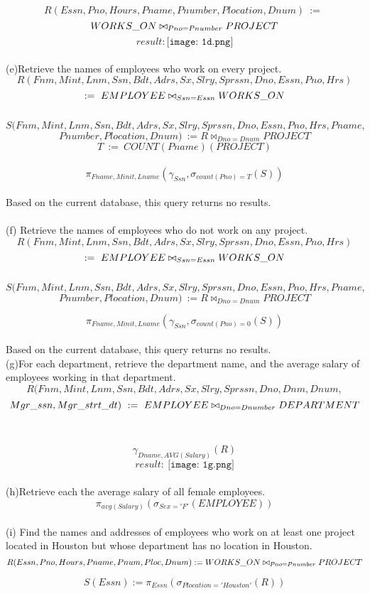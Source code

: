 \documentclass[paper=a4, fontsize=11pt]{scrartcl}
\begin{document}
$$R(Essn,Pno,Hours,Pname,Pnumber,Plocation,Dnum)\ :=\ $$
$$WORKS\char`_ON \bowtie _{Pno=Pnumber} PROJECT$$
$$result: \texttt{[image: 1d.png]}$$\\ 
(e)Retrieve the names of employees who work on every project.
$$R(Fnm, Mint, Lnm, Ssn, Bdt, Adrs, Sx, Slry, Sprssn, Dno,Essn,Pno,Hrs)$$ $$:=\ EMPLOYEE \bowtie_{Ssn=Essn} WORKS\char`_ON$$ \\ $$S(Fnm, Mint, Lnm, Ssn, Bdt, Adrs, Sx, Slry, Sprssn, Dno,Essn,Pno,Hrs,Pname,$$ $$Pnumber,Plocation,Dnum)\ := R \bowtie _{Dno=Dnum} PROJECT$$
$$T\ :=\ COUNT(Pname)(PROJECT)$$\\
$$\pi_{Fname,Minit,Lname}(\gamma_{Ssn}, \sigma_{count(Pno)=T}(S))$$\\
Based on the current database, this query returns no results.\\ \\
(f) Retrieve the names of employees who do not work on any project.
$$R(Fnm, Mint, Lnm, Ssn, Bdt, Adrs, Sx, Slry, Sprssn, Dno,Essn,Pno,Hrs)$$ $$:=\ EMPLOYEE \bowtie_{Ssn=Essn} WORKS\char`_ON$$ \\ $$S(Fnm, Mint, Lnm, Ssn, Bdt, Adrs, Sx, Slry, Sprssn, Dno,Essn,Pno,Hrs,Pname,$$ $$Pnumber,Plocation,Dnum)\ := R \bowtie _{Dno=Dnum} PROJECT$$

$$\pi_{Fname,Minit,Lname}(\gamma_{Ssn}, \sigma_{count(Pno)=0}(S))$$\\
Based on the current database, this query returns no results.\\ 
(g)For each department, retrieve the department name, and the average salary of employees working in that department.
$$R(Fnm, Mint, Lnm, Ssn, Bdt, Adrs, Sx, Slry, Sprssn, Dno,Dnm,Dnum,$$ $$Mgr\char`_ssn,Mgr\char`_strt\char`_dt)\ :=\ EMPLOYEE \bowtie_{Dno=Dnumber} DEPARTMENT$$\\ \\
$$\gamma_{Dname,AVG(Salary)}(R)$$
$$result:\ \texttt{[image: 1g.png]}$$ \\
(h)Retrieve each the average salary of all female employees.
$$\pi_{avg(Salary)}(\sigma_{Sex='F'}(EMPLOYEE))$$\\ 
(i) Find the names and addresses of employees who work on at least one project located in Houston but whose department has no location in Houston.
$$R(Essn,Pno,Hours,Pname,Pnum,Ploc,Dnum) := WORKS\char`_ON \bowtie_{Pno=Pnumber}PROJECT$$

$$S(Essn) := \pi_{Essn}(\sigma_{Plocation='Houston'}(R))$$
\end{document}
